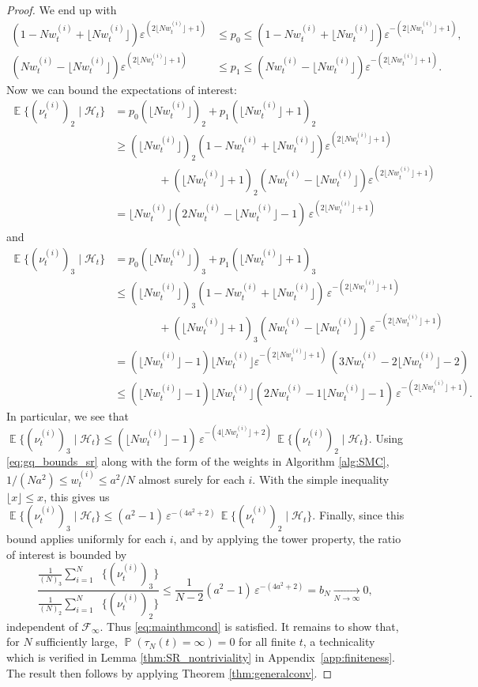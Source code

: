 \documentclass{article}
\theoremstyle{definition}
\DeclareMathOperator{\Prob}{\mathbb{P}}
\DeclareMathOperator{\E}{\mathbb{E}}
\DeclareMathOperator{\Et}{\mathbb{E}_t}
\newcommand{\flnw}{\lfloor N w_t^{(i)} \rfloor}
\newcommand{\1}[1]{\mathbbm{1}_{\{#1\}}}
\begin{document}
\begin{proof}
We end up with
\begin{align}
(1-N w_t^{(i)} + \flnw) \varepsilon^{(2\flnw +1)} &\leq p_0  \leq (1-N w_t^{(i)} + \flnw) \varepsilon^{-(2\flnw+1)} ,\nonumber\\
(N w_t^{(i)} - \flnw) \varepsilon^{(2\flnw +1)} &\leq p_1 \leq (N w_t^{(i)} - \flnw) \varepsilon^{-(2\flnw+1)} . \label{eq:SR_p1_UL_bounds}
\end{align}
Now we can bound the expectations of interest:
\begin{align*}
\E\{ (\nu_t^{(i)})_2 \mid \mathcal{H}_t \} 
&= p_0 (\flnw)_2 + p_1 (\flnw +1)_2 \\
&\geq (\flnw)_2 (1- N w_t^{(i)} + \flnw) \varepsilon^{(2\flnw +1)} \\
&\qquad\qquad + (\flnw +1)_2 (N w_t^{(i)} - \flnw) \varepsilon^{(2\flnw +1)}\\
&= \flnw (2N w_t^{(i)} -\flnw -1) \,\varepsilon^{(2\flnw +1)}
\end{align*}
and
\begin{align*}
\E\{ (\nu_t^{(i)})_3 \mid \mathcal{H}_t \} 
&= p_0 (\flnw)_3 + p_1 (\flnw +1)_3 \\
&\leq (\flnw)_3 (1- N w_t^{(i)} + \flnw)\, \varepsilon^{-(2\flnw+1)} \\
&\qquad\qquad + (\flnw +1)_3 (N w_t^{(i)} - \flnw)\, \varepsilon^{-(2\flnw +1)} \\
&= (\flnw -1)\flnw  \varepsilon^{-(2\flnw +1)} \,  (3N w_t^{(i)} - 2\flnw -2) \\
&\leq (\flnw -1)\flnw  (2N w_t^{(i)} - 1\flnw -1) \,\varepsilon^{-(2\flnw +1)} .
\end{align*}
In particular, we see that
$\E\{ (\nu_t^{(i)})_3 \mid \mathcal{H}_t \}
\leq  (\flnw -1 ) \, \varepsilon^{-(4\flnw +2)} \, \E\{ (\nu_t^{(i)})_2 \mid \mathcal{H}_t \}$.
Using \eqref{eq:gq_bounds_sr} along with the form of the weights in Algorithm \ref{alg:SMC}, $1/(Na^2) \leq w_t^{(i)} \leq a^2/N$ almost surely for each $i$.
With the simple inequality $\lfloor x\rfloor \leq x$, this gives us 
$\E\{ (\nu_t^{(i)})_3 \mid \mathcal{H}_t \} \leq (a^2 -1 )\, \varepsilon^{-(4 a^2 +2)}\, \E \{ (\nu_t^{(i)})_2 \mid \mathcal{H}_t \}$. 
Finally, since this bound applies uniformly for each $i$, and by applying the tower property, the ratio of interest is bounded by
\begin{equation*}
\frac{\frac{1}{(N)_3} \sum_{i=1}^N \Et\{(\nu_t^{(i)})_3\}}{\frac{1}{(N)_2} \sum_{i=1}^N \Et\{(\nu_t^{(i)})_2\}}
\leq \frac{1}{N-2}(a^2 -1 )\, \varepsilon^{-(4a^2 +2)}  = b_N \underset{N\to\infty}{\longrightarrow} 0 ,
\end{equation*}
independent of $\mathcal{F}_\infty$. Thus \eqref{eq:mainthmcond} is satisfied.
It remains to show that, for $N$ sufficiently large, $\Prob(\tau_N(t) = \infty )=0$ for all finite $t$, a technicality which is verified in Lemma \ref{thm:SR_nontriviality} in Appendix~\ref{app:finiteness}. The result then follows by applying Theorem \ref{thm:generalconv}.
\end{proof}
\end{document}
